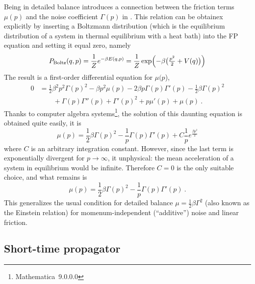 Being in detailed balance introduces a connection between the friction terms \(\mu(p)\) and the noise coefficient \(\Gamma(p)\) in . This relation can be obtainex explicitly by inserting a Boltzmann distribution (which is the equilibrium distribution of a system in thermal equilibrium with a heat bath) into the FP equation  and setting it equal zero, namely
%
\begin{equation}
	P_\text{Boltz}(q,p)
	= \frac1Ze^{-\beta E(q,p)}
	= \frac1Z\exp\Bigl(-\beta \bigl(\tfrac{p^2}2+V(q)\bigr)\Bigr)
\end{equation}
%
The result is a first-order differential equation for \(\mu(p\)),
%
\begin{equation}\begin{split}
	0
	&=
	\frac12 \beta^2 p^2 \Gamma(p)^2
	- \beta p^2 \mu(p)
	- 2 \beta p \Gamma(p) \Gamma'(p)
	- \frac12 \beta  \Gamma(p)^2
	\\&\qquad
	+\Gamma(p) \Gamma''(p)
	+ \Gamma'(p)^2
	+ p \mu'(p)
	+ \mu(p)  ~.
\end{split}\end{equation}
%
Thanks to computer algebra systems\footnote{Mathematica~9.0.0.0}, the solution of this daunting equation is obtained quite easily, it is
%
\begin{equation}
	\mu(p) = \frac12\beta\Gamma(p)^2 - \frac1p\Gamma(p)\Gamma'(p) + C\frac1pe^{\frac{\beta p^2}2}
\end{equation}
%
where \(C\) is an arbitrary integration constant. However, since the last term is exponentially divergent for \(p\to\infty\), it unphysical: the mean acceleration of a system in equilibrium would be infinite. Therefore \(C = 0\) is the only suitable choice, and what remains is
%
\begin{equation}
	\label{eqn:einstein}
	\mu(p) = \frac12\beta\Gamma(p)^2 - \frac1p\Gamma(p)\Gamma'(p) ~.
\end{equation}
%
This generalizes the usual condition for detailed balance \(\mu = \frac12\beta\Gamma^2\)  (also known as the Einstein relation) for momenum-independent (``additive'') noise and linear friction.



\subsection{Short-time propagator}


